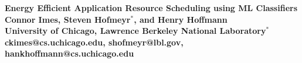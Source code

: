 \documentclass[a0,portrait]{a0poster}
\begin{document}
\begin{minipage}[b]{\linewidth}
\Huge \color{NavyBlue} \textbf{Energy Efficient Application Resource Scheduling using ML Classifiers} \color{Black}\\[0.5cm] %
\huge \textbf{Connor Imes, Steven Hofmeyr$^*$, and Henry Hoffmann}\\[0.25cm] %
\LARGE \textbf{University of Chicago, Lawrence Berkeley National Laboratory$^*$}\\ %
\Large \textbf{ckimes@cs.uchicago.edu, shofmeyr@lbl.gov, hankhoffmann@cs.uchicago.edu}
\end{minipage}
%


\end{document}

